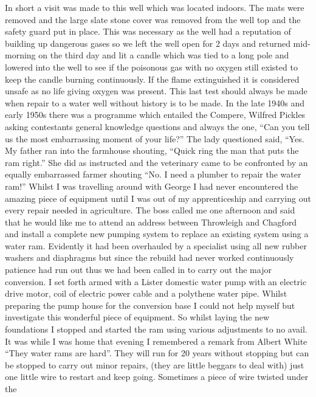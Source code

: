 
In short a visit was made to this well which was located indoors.  The mats were
removed and the large slate stone cover was removed from the well top and the
safety guard put in place.  This was necessary as the well had a reputation of
building up dangerous gases so we left the well open for 2 days and returned
mid-morning on the third day and lit a candle which was tied to a long pole and
lowered into the well to see if the poisonous gas with no oxygen still existed
to keep the candle burning continuously.  If the flame extinguished it is
considered unsafe as no life giving oxygen was present.  This last test should
always be made when repair to a water well without history is to be made. In
the late 1940s and early 1950s there was a programme which entailed the
Compere, Wilfred Pickles asking contestants general knowledge questions and
always the one, ``Can you tell us the most embarrassing moment of your life?''
The lady questioned said, ``Yes. My father ran into the farmhouse shouting,
``Quick ring the man that puts the ram right.''  She did as instructed and the
veterinary came to be confronted by an equally embarrassed farmer shouting
``No.  I need a plumber to repair the water ram!'' Whilst I was travelling
around with George I had never encountered the amazing piece of equipment until
I was out of my apprenticeship and carrying out every repair needed in
agriculture.  The boss called me one afternoon and said that he would like me
to attend an address between Throwleigh and Chagford and install a complete new
pumping system to replace an existing system using a water ram.  Evidently it
had been overhauled by a specialist using all new rubber washers and diaphragms
but since the rebuild had never worked continuously patience had run out thus
we had been called in to carry out the major conversion.  I set forth armed
with a Lister domestic water pump with an electric drive motor, coil of
electric power cable and a polythene water pipe.  Whilst preparing the pump
house for the conversion base I could not help myself but investigate this
wonderful piece of equipment.  So whilst laying the new foundations I stopped
and started the ram using various adjustments to no avail.  It was while I was
home that evening I remembered a remark from Albert White ``They water rams are
hard''.  They will run for 20 years without stopping but can be stopped to
carry out minor repairs, (they are little beggars to deal with) just one little
wire to restart and keep going.  Sometimes a piece of wire twisted under the
